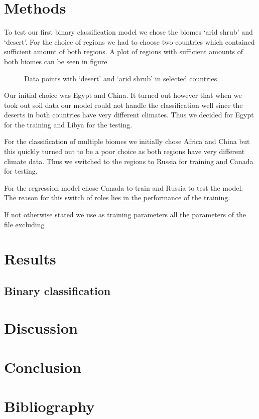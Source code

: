 \section{Methods}

To test our first binary classification model we chose the biomes `arid shrub' and `desert'. For the choice of regions
we had to choose two countries which contained sufficient amount of both regions. A plot of regions with sufficient amounts
of both biomes can be seen in figure 
\begin{figure}
  \centering
  \begin{minipage}{0.45\textwidth}
    \centering
    \missingfigure[figwidth=\textwidth]{}
    \caption{Data points with `desert' and `arid shrub' in selected countries.}
    \label{pl:}
  \end{minipage}
\end{figure}
Our initial choice was Egypt and China.
It turned out however that when we took out soil data our model could not handle the classification well since 
the deserts in both countries have very different climates. Thus we decided for Egypt for the training and Libya for the testing.

For the classification of multiple biomes we initially chose Africa and China but this quickly turned out to be a poor choice as
both regions have very different climate data. Thus we switched to the regions to Russia for training and Canada for testing.

For the regression model chose Canada to train and Russia to test the model. The reason for this switch of roles lies in the performance
of the training.

If not otherwise stated we use as training parameters all the parameters of the file  excluding
\begin{python}
\end{python}

\section{Results}

\subsection{Binary classification}



\section{Discussion}

\newpage
\section{Conclusion}


\section*{Bibliography}
\nocite{*}
\printbibliography[heading=none, keyword={secondary}]




